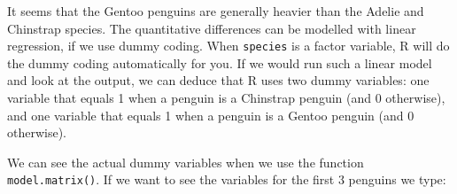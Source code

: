 It seems that the Gentoo penguins are generally heavier than the Adelie and Chinstrap species. The quantitative differences can be modelled with linear regression, if we use dummy coding. When \texttt{species} is a factor variable, R will do the dummy coding automatically for you. If we would run such a linear model and look at the output, we can deduce that R uses two dummy variables: one variable that equals 1 when a penguin is a Chinstrap penguin (and 0 otherwise), and one variable that equals 1 when a penguin is a Gentoo penguin (and 0 otherwise). 

\begin{knitrout}
\color{fgcolor}
\end{knitrout}

We can see the actual dummy variables when we use the function \texttt{model.matrix()}. If we want to see the variables for the first 3 penguins we type:

\begin{knitrout}
\color{fgcolor}
\end{knitrout}


